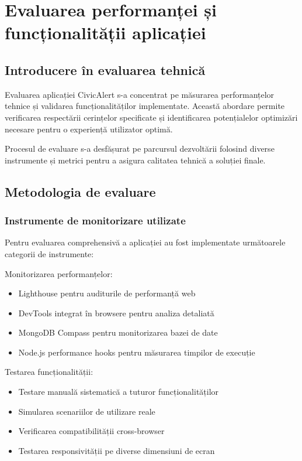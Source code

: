 \documentclass[12pt,a4paper]{report}
\begin{document}
\chapter{Evaluarea performanței și funcționalității aplicației}

\section{Introducere în evaluarea tehnică}

Evaluarea aplicației CivicAlert s-a concentrat pe măsurarea performanțelor tehnice și validarea funcționalităților implementate. Această abordare permite verificarea respectării cerințelor specificate și identificarea potențialelor optimizări necesare pentru o experiență utilizator optimă.

Procesul de evaluare s-a desfășurat pe parcursul dezvoltării folosind diverse instrumente și metrici pentru a asigura calitatea tehnică a soluției finale.

\section{Metodologia de evaluare}

\subsection{Instrumente de monitorizare utilizate}

Pentru evaluarea comprehensivă a aplicației au fost implementate următoarele categorii de instrumente:

Monitorizarea performanțelor:
\begin{itemize}
\item  Lighthouse pentru auditurile de performanță web
\item  DevTools integrat în browsere pentru analiza detaliată
\item  MongoDB Compass pentru monitorizarea bazei de date
\item  Node.js performance hooks pentru măsurarea timpilor de execuție
\end{itemize}

Testarea funcționalității:
\begin{itemize}
\item  Testare manuală sistematică a tuturor funcționalităților
\item  Simularea scenariilor de utilizare reale
\item  Verificarea compatibilității cross-browser
\item  Testarea responsivității pe diverse dimensiuni de ecran
\end{itemize}
\end{document}
